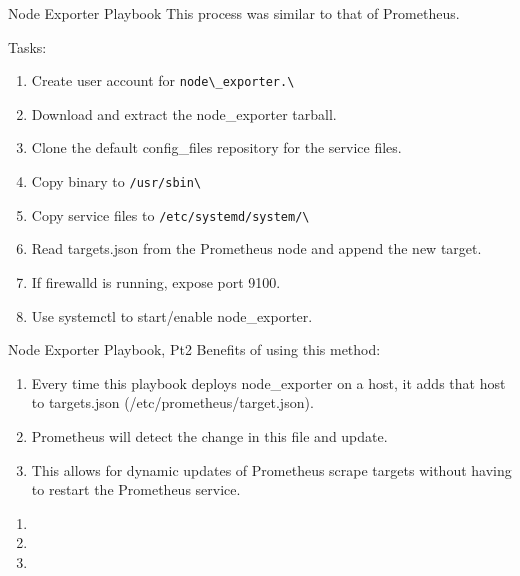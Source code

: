 \documentclass[14pt,compress,usenames,dvipsnames,aspectratio=169]{beamer}
\begin{document}
\begin{frame}{Node Exporter Playbook}
    This process was similar to that of Prometheus.  

    Tasks:
    \begin{enumerate}
        \item{Create user account for \verb+node\_exporter.\+} 
        \item{Download and extract the node\_exporter tarball.} 
        \item{Clone the default config\_files repository for the service files.} 
        \item{Copy binary to \verb+/usr/sbin\+} 
        \item{Copy service files to \verb+/etc/systemd/system/\+} 
        \item{Read targets.json from the Prometheus node and append the new target.} 
        \item{If firewalld is running, expose port 9100. } 
        \item{Use systemctl to start/enable node\_exporter.} 
    \end{enumerate}
\end{frame}


\begin{frame}{Node Exporter Playbook, Pt2}
    Benefits of using this method:
    \begin{enumerate}
        \item{Every time this playbook deploys node\_exporter on a host, it adds 
            that host to targets.json (/etc/prometheus/target.json).} 
        \item{Prometheus will detect the change in this file and update.} 
        \item{This allows for dynamic updates of Prometheus scrape targets without
            having to restart the Prometheus service.} 
    \end{enumerate}
\end{frame}



\begin{frame}{}
    \begin{enumerate}
        \item{} 
        \item{} 
        \item{} 
    \end{enumerate}
\end{frame}
\end{document}
